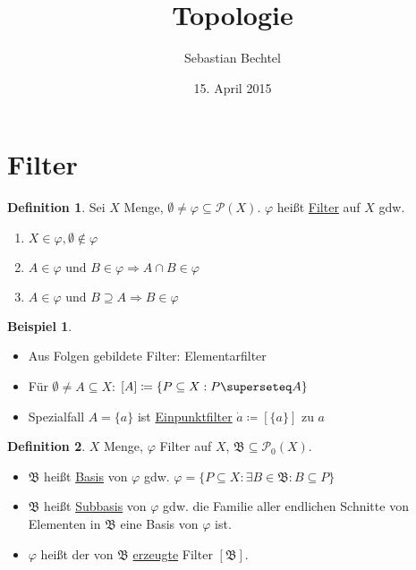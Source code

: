 \documentclass[12pt]{scrartcl}%
\theoremstyle{definition}
\newtheorem*{defn}{Definition}
\newtheorem{ex}{Beispiel}
\theoremstyle{remark}
\newcommand{\powerset}{\mathcal{P}}
\newcommand{\implies}{\Rightarrow}
\begin{document}
\author{Sebastian Bechtel}
\title{Topologie}
\date{15. April 2015}

\maketitle %

\section*{Filter}

\begin{defn}
    Sei $X$ Menge, $\emptyset\neq \varphi\subseteq \powerset(X)$. $\varphi$ heißt \underline{Filter} auf $X$ gdw.

    \begin{enumerate}[label=(\arabic*)]
        \item $X\in \varphi, \emptyset\not\in\varphi$
        \item $A\in\varphi \text{ und } B\in\varphi \implies A\cap B\in\varphi$
        \item $A\in\varphi \text{ und } B\supseteq A \implies B\in\varphi$
    \end{enumerate}
\end{defn}

\begin{ex}
    \begin{itemize}
        \item Aus Folgen gebildete Filter: Elementarfilter
        \item Für $\emptyset \neq A\subseteq X$: $[A]\coloneqq \{P\subseteq X: P\superseteq A\}$
        \item Spezialfall $A=\{a\}$ ist \underline{Einpunktfilter} $\dot a\coloneqq [\{a\}]$ zu $a$
    \end{itemize}
\end{ex}

\begin{defn}
    $X$ Menge, $\varphi$ Filter auf $X$, $\mathfrak{B}\subseteq \powerset_0(X)$.

    \begin{itemize}
        \item $\mathfrak{B}$ heißt \underline{Basis} von $\varphi$ gdw. $\varphi = \{P\subseteq X: \exists B\in\mathfrak{B}: B\subseteq P\}$
        \item $\mathfrak{B}$ heißt \underline{Subbasis} von $\varphi$ gdw. die Familie aller endlichen Schnitte von Elementen in $\mathfrak{B}$ eine Basis von $\varphi$ ist.
        \item $\varphi$ heißt der von $\mathfrak{B}$ \underline{erzeugte} Filter $[\mathfrak{B}]$.
    \end{itemize}
\end{defn}
\end{document}
